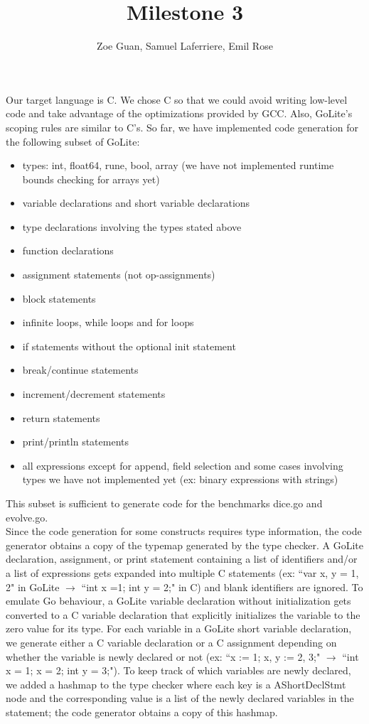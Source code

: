 \documentclass[]{article}
\title{Milestone 3}
\author{Zoe Guan, Samuel Laferriere, Emil Rose}
\begin{document}
\maketitle

Our target language is C. We chose C so that we could avoid writing low-level code and take advantage of the optimizations provided by GCC. Also, GoLite's scoping rules are similar to C's. So far, we have implemented code generation for the following subset of GoLite:

\begin{itemize}
	\item types: int, float64, rune, bool, array (we have not implemented runtime bounds checking for arrays yet) 
	\item variable declarations and short variable declarations
	\item type declarations involving the types stated above
	\item function declarations
	\item assignment statements (not op-assignments)
	\item block statements
	\item infinite loops, while loops and for loops
	\item if statements without the optional init statement
	\item break/continue statements
	\item increment/decrement statements
	\item return statements
	\item print/println statements
	\item all expressions except for append, field selection and some cases involving types we have not implemented yet (ex: binary expressions with strings) 
\end{itemize}

This subset is sufficient to generate code for the benchmarks dice.go and evolve.go. 
\\[12pt]
Since the code generation for some constructs requires type information, the code generator obtains a copy of the typemap generated by the type checker. A GoLite declaration, assignment, or print statement containing a list of identifiers and/or a list of expressions gets expanded into multiple C statements (ex: ``var x, y = 1, 2" in GoLite $\rightarrow$ ``int x =1; int y = 2;" in C) and blank identifiers are ignored. To emulate Go behaviour, a GoLite variable declaration without initialization gets converted to a C variable declaration that explicitly initializes the variable to the zero value for its type. For each variable in a GoLite short variable declaration, we generate either a C variable declaration or a C assignment depending on whether the variable is newly declared or not (ex: ``x := 1; x, y := 2, 3;" $\rightarrow$ ``int x = 1; x = 2; int y = 3;"). To keep track of which variables are newly declared, we added a hashmap to the type checker where each key is a AShortDeclStmt node and the corresponding value is a list of the newly declared variables in the statement; the code generator obtains a copy of this hashmap.
\end{document}
